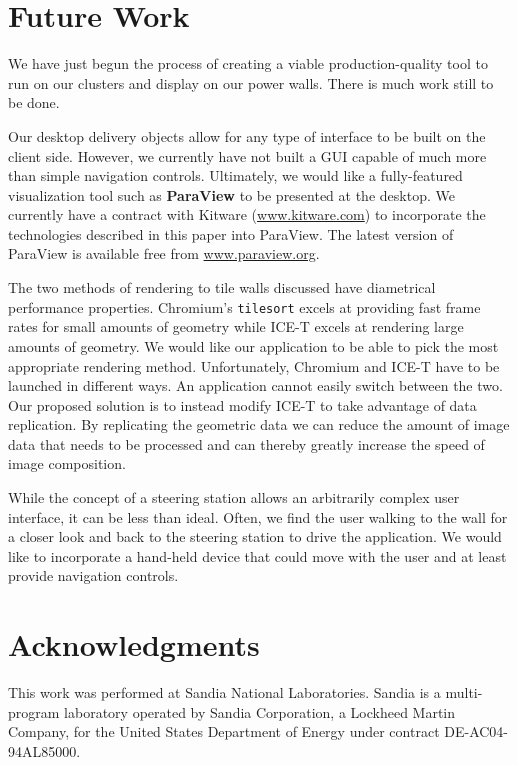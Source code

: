 \documentclass{acmsiggraph}
\newcommand{\cidentifier}[1]{\texttt{#1}}
\newcommand{\keyterm}[1]{\textbf{#1}}
\begin{document}
  \section{Future Work}
  \label{sec:future_work}

  We have just begun the process of creating a viable production-quality
  tool to run on our clusters and display on our power walls.  There is
  much work still to be done.

  Our desktop delivery objects allow for any type of interface to be built
  on the client side.  However, we currently have not built a GUI capable
  of much more than simple navigation controls.  Ultimately, we would like
  a fully-featured visualization tool such as \keyterm{ParaView}
  \cite{Law01} to be presented at the desktop.  We currently have a
  contract with Kitware (\href{http://www.kitware.com}{www.kitware.com}) to
  incorporate the technologies described in this paper into ParaView.  The
  latest version of ParaView is available free from
  \href{http://www.paraview.org}{www.paraview.org}.

  The two methods of rendering to tile walls discussed have diametrical
  performance properties.  Chromium's \cidentifier{tile\-sort} excels at
  providing fast frame rates for small amounts of geometry while ICE-T
  excels at rendering large amounts of geometry.  We would like our
  application to be able to pick the most appropriate rendering method.
  Unfortunately, Chromium and ICE-T have to be launched in different ways.
  An application cannot easily switch between the two.  Our proposed
  solution is to instead modify ICE-T to take advantage of data
  replication.  By replicating the geometric data we can reduce the amount
  of image data that needs to be processed and can thereby greatly increase
  the speed of image composition.

  While the concept of a steering station allows an arbitrarily complex
  user interface, it can be less than ideal.  Often, we find the user
  walking to the wall for a closer look and back to the steering station to
  drive the application.  We would like to incorporate a hand-held device
  that could move with the user and at least provide navigation controls.


  \section{Acknowledgments}

  This work was performed at Sandia National Laboratories.  Sandia is a
  multi-program laboratory operated by Sandia Corporation, a Lockheed
  Martin Company, for the United States Department of Energy under contract
  DE-AC04-94AL85000.
\end{document}
